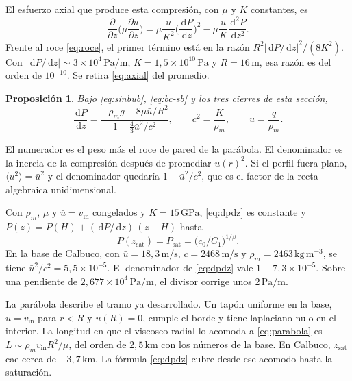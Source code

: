 \documentclass[11pt,a4paper]{article}
\newcommand{\dd}{\,\mathrm{d}}
\newcommand{\p}{\partial}
\newcommand{\vin}{v_{\mathrm{in}}}
\newcommand{\ms}{\ensuremath{\,\mathrm{m/s}}}
\newcommand{\Pam}{\ensuremath{\,\mathrm{Pa/m}}}
\newtheorem{proposicion}{Proposición}
\begin{document}
El esfuerzo axial que produce esta compresión, con $\mu$ y $K$
constantes, es
\begin{equation}
\label{eq:axial}
\frac{\p}{\p z}\Biggl(\mu\frac{\p u}{\p z}\Biggr)
=\mu\frac{u}{K^2}\Biggl(\frac{\dd P}{\dd z}\Biggr)^2
-\mu\frac{u}{K}\frac{\dd^2 P}{\dd z^2}.
\end{equation}
Frente al roce \eqref{eq:roce}, el primer término está en la razón
$R^2|\dd P/\dd z|^2/(8K^2)$. Con
$|\dd P/\dd z|\sim 3\times 10^{4}\Pam$, $K=1{,}5\times 10^{10}\,\mathrm{Pa}$
y $R=16\,\mathrm{m}$, esa razón es del orden de $10^{-10}$. Se retira
\eqref{eq:axial} del promedio.

\begin{proposicion}
Bajo \eqref{eq:sinbub}, \eqref{eq:bc-sb} y los tres cierres de esta
sección,
\begin{equation}
\label{eq:dpdz}
\frac{\dd P}{\dd z}
=\frac{-\rho_m g-8\mu\bar u/R^2}{1-\frac43\bar u^2/c^2},
\qquad
c^2=\frac{K}{\rho_m},
\qquad
\bar u=\frac{\bar q}{\rho_m}.
\end{equation}
\end{proposicion}

El numerador es el peso más el roce de pared de la parábola. El
denominador es la inercia de la compresión después de promediar
$u(r)^2$. Si el perfil fuera plano, $\langle u^2\rangle=\bar u^2$ y
el denominador quedaría $1-\bar u^2/c^2$, que es el factor de la
recta algebraica unidimensional.

Con $\rho_m$, $\mu$ y $\bar u=\vin$ congelados y $K=15\,\mathrm{GPa}$,
\eqref{eq:dpdz} es constante y
$P(z)=P(H)+(\dd P/\dd z)\,(z-H)$ hasta
\begin{equation}
\label{eq:Psat}
P(z_{\mathrm{sat}})=P_{\mathrm{sat}}=\bigl(c_0/C_1\bigr)^{1/\beta}.
\end{equation}
En la base de Calbuco, con $\bar u=18{,}3\ms$, $c=2468\ms$ y
$\rho_m=2463\,\mathrm{kg\,m^{-3}}$, se tiene
$\bar u^2/c^2=5{,}5\times 10^{-5}$. El denominador de \eqref{eq:dpdz}
vale $1-7{,}3\times 10^{-5}$. Sobre una pendiente de
$2{,}677\times 10^{4}\Pam$, el divisor corrige unos $2\Pam$.

La parábola describe el tramo ya desarrollado. Un tapón uniforme en
la base, $u=\vin$ para $r<R$ y $u(R)=0$, cumple el borde y tiene
laplaciano nulo en el interior. La longitud en que el viscoseo
radial lo acomoda a \eqref{eq:parabola} es
$L\sim\rho_m\vin R^2/\mu$, del orden de $2{,}5\,\mathrm{km}$ con los
números de la base. En Calbuco, $z_{\mathrm{sat}}$ cae cerca de
$-3{,}7\,\mathrm{km}$. La fórmula \eqref{eq:dpdz} cubre desde ese
acomodo hasta la saturación.
\end{document}
